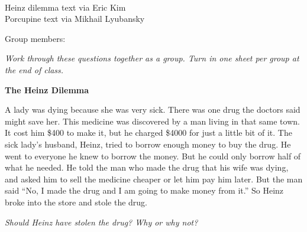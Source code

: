 


\newcommand{\wsdilemmaheading}[1]{%
  {\Large\bfseries #1\par}%
  \vspace{0.2\baselineskip}%
}

\newcommand{\wsstoryfont}{\linespread{1.1}\fontsize{13}{15.6}\selectfont}



{\raggedleft\small\linespread{1.1}\selectfont
\wscourseval\\
Heinz dilemma text via Eric Kim\\
Porcupine text via Mikhail Lyubansky\par}

\wsbigtitle

Group members:\par
\vspace{0.2\baselineskip}
\wsmembertable
\vspace{0.6\baselineskip}
\wssectiontable
\vspace{0.4\baselineskip}

\textit{Work through these questions together as a group. Turn in one sheet per group at the end of class.}

\wsdilemmaheading{The Heinz Dilemma}

{\wsstoryfont
A lady was dying because she was very sick. There was one drug the doctors said might save her. This medicine was discovered by a man living in that same town. It cost him \$400 to make it, but he charged \$4000 for just a little bit of it. The sick lady's husband, Heinz, tried to borrow enough money to buy the drug. He went to everyone he knew to borrow the money. But he could only borrow half of what he needed. He told the man who made the drug that his wife was dying, and asked him to sell the medicine cheaper or let him pay him later. But the man said ``No, I made the drug and I am going to make money from it.'' So Heinz broke into the store and stole the drug.

\textit{Should Heinz have stolen the drug? Why or why not?}

}

\newpage

